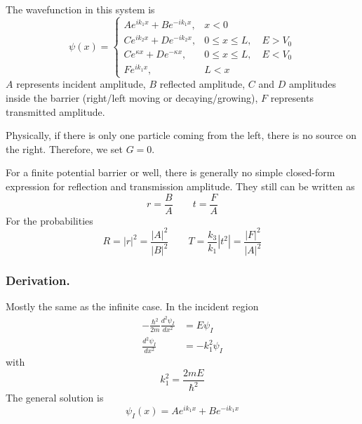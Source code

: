 \documentclass[../../../main.tex]{subfiles}
\begin{document}
The wavefunction in this system is
\begin{equation*}
    \psi(x) =
    \begin{cases}
        A e^{i k_1 x} + B e^{-i k_1 x},   & x < 0                        \\[1mm]
        C e^{i k_2 x} + D e^{-i k_2 x},   & 0 \le x \le L, \quad E > V_0 \\[1mm]
        C e^{\kappa x} + D e^{-\kappa x}, & 0 \le x \le L, \quad E < V_0 \\[1mm]
        F e^{i k_1 x},                    & L<x
    \end{cases}
\end{equation*}
$A$ represents incident amplitude, $B$ reflected amplitude, $C$ and $D$ amplitudes inside the barrier (right/left moving or decaying/growing), $F$ represents transmitted amplitude.

Physically, if there is only one particle coming from the left, there is no source on the right.
Therefore, we set $G=0$.

For a finite potential barrier or well, there is generally no simple closed-form expression for reflection and transmission amplitude.
They still can be written as 
\begin{equation*}
    r=\frac{B }{A }\qquad t=\frac{F }{A}
\end{equation*}
For the probabilities
\begin{equation*}
    R=|r|^2=\frac{|A|^2}{|B|^2}\qquad T=\frac{k_3 }{k_1 }|t^2|=\frac{|F|^2}{|A|^2}
\end{equation*}
\subsubsection{Derivation.}
Mostly the same as the infinite case.
In the incident region
\begin{align*}
    -\frac{\hbar^2}{2m} \frac{d^2 \psi_{I}}{dx^2} & =  E \psi_I        \\
    \frac{d^2 \psi_{I}}{dx^2}                     & = - k_1^2 \psi_{I}
\end{align*}
with
\begin{equation*}
    k_1^2 =\frac{2 m E}{\hbar^2}
\end{equation*}
The general solution is
\begin{equation*}
    \psi_I(x) = A e^{i k_1 x} + B e^{-i k_1 x}
\end{equation*}
\end{document}
